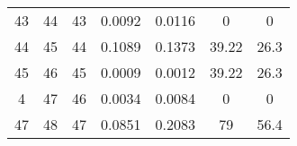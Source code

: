 \begin{table}
\begin{adjustbox}{width=0.95\textwidth,center=\textwidth}
\begin{tabular}{ccccccc}
43                                                        & 44                                                          & 43                                                  & 0.0092                                                                    & 0.0116                                                                    & 0                                                                           & 0                                                                                \\
44                                                        & 45                                                          & 44                                                  & 0.1089                                                                    & 0.1373                                                                    & 39.22                                                                       & 26.3                                                                             \\
45                                                        & 46                                                          & 45                                                  & 0.0009                                                                    & 0.0012                                                                    & 39.22                                                                       & 26.3                                                                             \\
4                                                         & 47                                                          & 46                                                  & 0.0034                                                                    & 0.0084                                                                    & 0                                                                           & 0                                                                                \\
47                                                        & 48                                                          & 47                                                  & 0.0851                                                                    & 0.2083                                                                    & 79                                                                          & 56.4                                                                             \\

\end{tabular}
\end{adjustbox}
\end{table}
